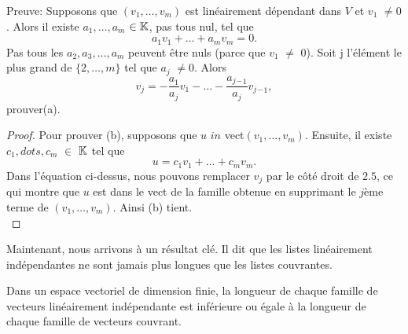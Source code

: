 \documentclass[12pt]{book}
\begin{document}
\hspace{1cm}Preuve: Supposons que $(v_1,\ldots,v_m)$ est lin\'eairement d\'ependant dans $V$ et $v_1$ $\ne 0$. Alors il existe $a_1,\ldots,a_m$ $\in \mathbb{K}$, pas tous nul, tel que 
\begin{equation*}
    a_1v_1 + \ldots+ a_mv_m = 0.
\end{equation*}
Pas tous les $a_2,a_3,\dots,a_m$ peuvent \^etre nuls (parce que $v_1$ $\ne$ $0$). Soit j l’élément le plus grand de $\{2,\ldots,m\}$ tel que $a_j$ $\ne 0$. Alors    
\begin{equation*}
    v_j = -\frac{a_1}{a_j}v_1 - \ldots - \frac{a_j{_-}_1}{a_j}v_j{_-}_1,
\end{equation*}
prouver(a).\\

\begin{proof}  Pour prouver (b), supposons que $u$ $in$ vect$(v_1,\ldots,v_m)$. Ensuite, il existe $c_1,dots,c_m$ $\in$ $\mathbb{K}$ tel que 
\begin{equation*}
    u = c_1v_1 + \ldots + c_mv_m.
\end{equation*}
Dans l’équation ci-dessus, nous pouvons remplacer $v_j$ par le c\^ot\'e droit de $2.5$, ce qui montre que $u$ est dans le vect de la famille obtenue en supprimant le $j$\`eme terme de $(v_1,\ldots,v_m)$. Ainsi (b) tient.\\
\end{proof}
\hspace{1cm}Maintenant, nous arrivons à un résultat clé. Il dit que les listes linéairement indépendantes ne sont jamais plus longues que les listes couvrantes.\\
\begin{thm}
Dans un espace vectoriel de dimension finie, la longueur de chaque famille de vecteurs lin\'eairement ind\'ependante est inf\'erieure ou \'egale \`a la longueur de chaque famille de vecteurs couvrant.
\end{thm}
\end{document}
